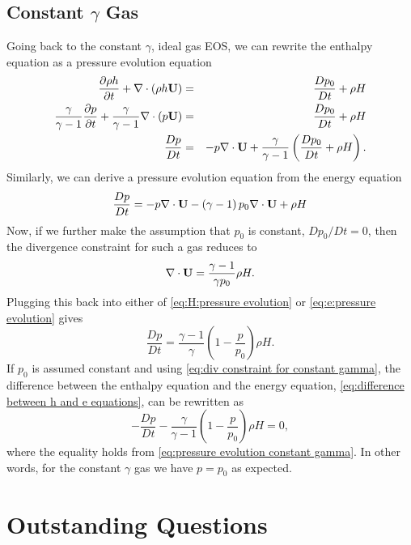 \subsection{Constant $\gamma$ Gas}
Going back to the constant $\gamma$, ideal gas EOS, we can rewrite the
enthalpy equation as a pressure evolution equation
\begin{eqnarray}
  \frac{\partial\rho h}{\partial t} + \nabla\cdot\left(\rho h{\bf U}\right) &=& \frac{Dp_0}{Dt} + \rho H {} \nonumber\\
  \frac{\gamma}{\gamma-1}\frac{\partial p}{\partial t} + \frac{\gamma}{\gamma-1}\nabla\cdot\left(p{\bf U}\right) &=& \frac{Dp_0}{Dt} + \rho H {} \nonumber\\
  \frac{Dp}{Dt} &=& -p\nabla\cdot{\bf U} + \frac{\gamma}{\gamma-1}\left(\frac{Dp_0}{Dt}+\rho H\right) \label{eq:H:pressure evolution}.
\end{eqnarray}
Similarly, we can derive a pressure evolution equation from the energy equation
\begin{equation}
  \frac{Dp}{Dt} = -p\nabla\cdot{\bf U} - \left(\gamma-1\right)p_0\nabla\cdot{\bf U} + \rho H \label{eq:e:pressure evolution}
\end{equation}
Now, if we further make the assumption that $p_0$ is constant,
$Dp_0/Dt = 0$, then the divergence constraint for such a gas reduces
to
\begin{equation}
\nabla\cdot{\bf U} = \frac{\gamma-1}{\gamma p_0}\rho H \label{eq:div constraint for constant gamma}.
\end{equation}
Plugging this back into either of \eqref{eq:H:pressure evolution} or \eqref{eq:e:pressure evolution} gives
\begin{equation}
  \frac{Dp}{Dt} = \frac{\gamma-1}{\gamma}\left(1-\frac{p}{p_0}\right)\rho H. \label{eq:pressure evolution constant gamma}
\end{equation}
If $p_0$ is assumed constant and using \eqref{eq:div constraint for
  constant gamma}, the difference between the enthalpy equation and
the energy equation, \eqref{eq:difference between h and e equations},
can be rewritten as
\[
-\frac{Dp}{Dt} - \frac{\gamma}{\gamma-1}\left(1-\frac{p}{p_0}\right)\rho H = 0,
\]
where the equality holds from \eqref{eq:pressure evolution constant
  gamma}. In other words, for the constant $\gamma$ gas we have
$p=p_0$ as expected.

\section{Outstanding Questions}

